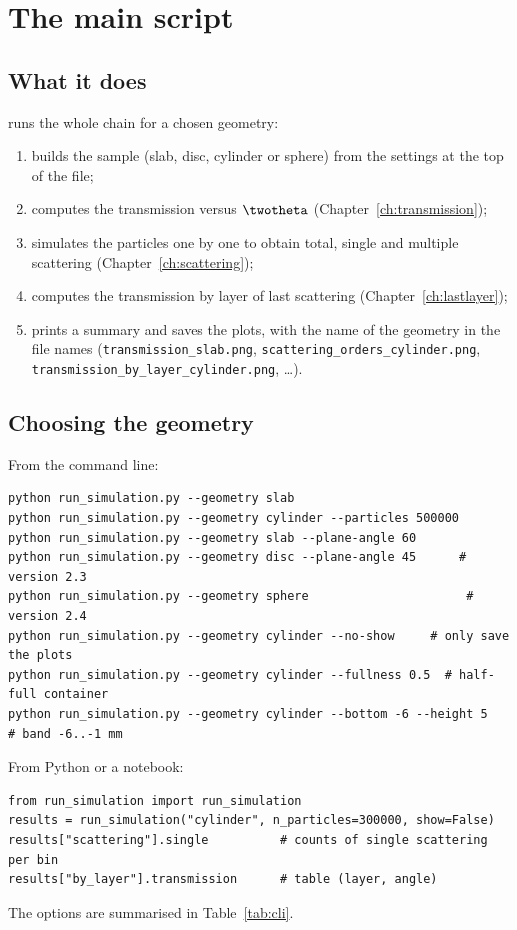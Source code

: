 \chapter{The main script}
\label{ch:main}

\section{What it does}

 runs the whole chain for a chosen geometry:
\begin{enumerate}
  \item builds the sample (slab, disc, cylinder or sphere) from the settings at the top of the file;
  \item computes the transmission versus $\twotheta$ (Chapter~\ref{ch:transmission});
  \item simulates the particles one by one to obtain total, single and multiple scattering (Chapter~\ref{ch:scattering});
  \item computes the transmission by layer of last scattering (Chapter~\ref{ch:lastlayer});
  \item \raggedright prints a summary and saves the plots, with the name of the geometry in the file names
        (\texttt{transmission\_slab.png}, \texttt{scattering\_orders\_cylinder.png}, \texttt{transmission\_by\_layer\_cylinder.png}, \ldots).
\end{enumerate}

\section{Choosing the geometry}

From the command line:
\begin{lstlisting}[style=shell]
python run_simulation.py --geometry slab
python run_simulation.py --geometry cylinder --particles 500000
python run_simulation.py --geometry slab --plane-angle 60
python run_simulation.py --geometry disc --plane-angle 45      # version 2.3
python run_simulation.py --geometry sphere                      # version 2.4
python run_simulation.py --geometry cylinder --no-show     # only save the plots
python run_simulation.py --geometry cylinder --fullness 0.5  # half-full container
python run_simulation.py --geometry cylinder --bottom -6 --height 5   # band -6..-1 mm
\end{lstlisting}
From Python or a notebook:
\begin{lstlisting}
from run_simulation import run_simulation
results = run_simulation("cylinder", n_particles=300000, show=False)
results["scattering"].single          # counts of single scattering per bin
results["by_layer"].transmission      # table (layer, angle)
\end{lstlisting}
The options are summarised in Table~\ref{tab:cli}.

